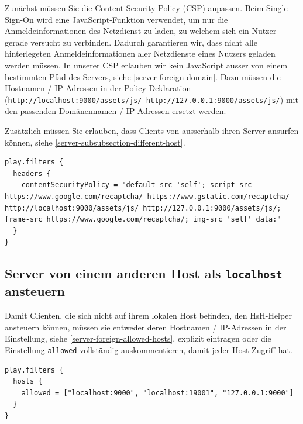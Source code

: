 \documentclass[12pt,DIV14,BCOR10mm,a4paper,parskip=half-,headsepline,headinclude,english,ngerman,bibliography=totocnumbered]{scrreprt}
\begin{document}
Zunächst müssen Sie die Content Security Policy (CSP) anpassen.\label{server-adjust-csp}
Beim Single Sign-On wird eine JavaScript-Funktion verwendet, um nur die Anmeldeinformationen des Netzdienst zu laden, zu welchem sich ein Nutzer gerade versucht zu verbinden.
Dadurch garantieren wir, dass nicht alle hinterlegeten Anmeldeinformationen aler Netzdienste eines Nutzers geladen werden müssen.
In unserer CSP erlauben wir kein JavaScript ausser von einem bestimmten Pfad des Servers, siehe \autoref{server-foreign-domain}.
Dazu müssen die Hostnamen / IP-Adressen in der Policy-Deklaration (\texttt{http://localhost:9000/assets/js/ http://127.0.0.1:9000/assets/js/}) mit den passenden Domänennamen / IP-Adressen ersetzt werden.

Zusätzlich müssen Sie erlauben, dass Clients von ausserhalb ihren Server ansurfen können, siehe \autoref{server-subsubsection-different-host}.

\begin{lstlisting}[label=server-foreign-domain, caption={"Content Security Header"-Einstellung innerhalb der Konfigurationsdatei}, captionpos=b]
play.filters {
  headers {
    contentSecurityPolicy = "default-src 'self'; script-src https://www.google.com/recaptcha/ https://www.gstatic.com/recaptcha/ http://localhost:9000/assets/js/ http://127.0.0.1:9000/assets/js/; frame-src https://www.google.com/recaptcha/; img-src 'self' data:"
  }
}
\end{lstlisting}

\subsection{Server von einem anderen Host als \texttt{localhost} ansteuern}
\label{server-subsubsection-different-host}

Damit Clienten, die sich nicht auf ihrem lokalen Host befinden, den HsH-Helper ansteuern können, müssen sie entweder deren Hostnamen / IP-Adressen in der Einstellung, siehe \autoref{server-foreign-allowed-hosts}, explizit eintragen oder die Einstellung \texttt{allowed} vollständig auskommentieren, damit jeder Host Zugriff hat.

\begin{lstlisting}[label=server-foreign-allowed-hosts, caption={"Erlaubte Hosts"-Einstellung innerhalb der Konfigurationsdatei},captionpos=b]
play.filters {
  hosts {
    allowed = ["localhost:9000", "localhost:19001", "127.0.0.1:9000"]
  }
}
\end{lstlisting}
\end{document}
